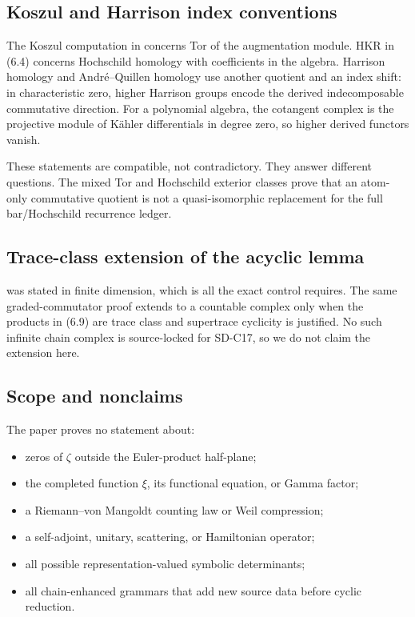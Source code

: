 \subsection{Koszul and Harrison index conventions}

The Koszul computation in  concerns Tor of the augmentation
module.  HKR in (6.4) concerns Hochschild homology with coefficients in the
algebra.  Harrison homology and André--Quillen homology use another quotient
and an index shift: in characteristic zero, higher Harrison groups encode
the derived indecomposable commutative direction.  For a polynomial algebra,
the cotangent complex is the projective module of K\"ahler differentials in
degree zero, so higher derived functors vanish.

These statements are compatible, not contradictory.  They answer different
questions.  The mixed Tor and Hochschild exterior classes prove that an
atom-only commutative quotient is not a quasi-isomorphic replacement for the
full bar/Hochschild recurrence ledger.

\subsection{Trace-class extension of the acyclic lemma}

 was stated in finite dimension, which is all the exact
control requires.  The same graded-commutator proof extends to a countable
complex only when the products in (6.9) are trace class and supertrace
cyclicity is justified.  No such infinite chain complex is source-locked for
SD-C17, so we do not claim the extension here.

\subsection{Scope and nonclaims}

The paper proves no statement about:

\begin{itemize}
\item zeros of $\zeta$ outside the Euler-product half-plane;
\item the completed function $\xi$, its functional equation, or Gamma factor;
\item a Riemann--von Mangoldt counting law or Weil compression;
\item a self-adjoint, unitary, scattering, or Hamiltonian operator;
\item all possible representation-valued symbolic determinants;
\item all chain-enhanced grammars that add new source data before cyclic
  reduction.
\end{itemize}

